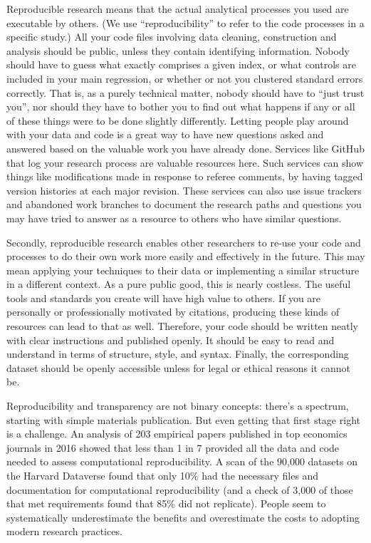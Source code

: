 Reproducible research means that the actual analytical processes you used are executable by others.\cite{dafoe2014science}
(We use ``reproducibility'' to refer to the code processes in a specific study.)
All your code files involving data cleaning, construction and analysis
should be public, unless they contain identifying information.
Nobody should have to guess what exactly comprises a given index,
or what controls are included in your main regression,
or whether or not you clustered standard errors correctly.
That is, as a purely technical matter, nobody should have to ``just trust you'',
nor should they have to bother you to find out what happens
if any or all of these things were to be done slightly differently.\cite{simmons2011false,simonsohn2015specification,wicherts2016degrees}
Letting people play around with your data and code
is a great way to have new questions asked and answered
based on the valuable work you have already done.
Services like GitHub that log your research process are valuable resources here.
Such services can show things like modifications made in response to referee comments,
by having tagged version histories at each major revision.
These services can also use issue trackers and abandoned work branches
to document the research paths and questions you may have tried to answer
as a resource to others who have similar questions.

Secondly, reproducible research
enables other researchers to re-use your code and processes
to do their own work more easily and effectively in the future.
This may mean applying your techniques to their data
or implementing a similar structure in a different context.
As a pure public good, this is nearly costless.
The useful tools and standards you create will have high value to others.
If you are personally or professionally motivated by citations,
producing these kinds of resources can lead to that as well.
Therefore, your code should be written neatly with clear instructions and published openly.
It should be easy to read and understand in terms of structure, style, and syntax.
Finally, the corresponding dataset should be openly accessible
unless for legal or ethical reasons it cannot be.

Reproducibility and transparency are not binary concepts:
there's a spectrum, starting with simple materials publication.
But even getting that first stage right is a challenge.
An analysis of 203 empirical papers published in top economics journals in 2016
showed that less than 1 in 7 provided all the data and code
needed to assess computational reproducibility.\cite{galiani2017incentives}
A scan of the 90,000 datasets on the Harvard Dataverse
found that only 10\% had the necessary files and documentation
for computational reproducibility
(and a check of 3,000 of those that met requirements
found that 85\% did not replicate).
People seem to systematically underestimate the benefits
and overestimate the costs to adopting modern research practices.

